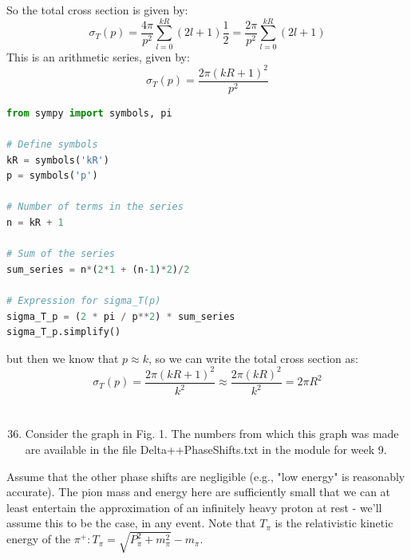 \documentclass[12pt]{article}
\begin{document}
So the total cross section is given by:
\begin{equation}
\sigma_T(p) = \frac{4 \pi}{p^2} \sum_{l=0}^{kR} (2 l+1) \frac{1}{2} = \frac{2 \pi}{p^2} \sum_{l=0}^{kR} (2 l+1)
\end{equation}
This is an arithmetic series, given by:
\begin{equation}
  \sigma_T(p) = \frac{2\pi (kR+1)^2}{p^2}
\end{equation}
\begin{lstlisting}[language=Python]
from sympy import symbols, pi

# Define symbols
kR = symbols('kR')
p = symbols('p')

# Number of terms in the series
n = kR + 1

# Sum of the series
sum_series = n*(2*1 + (n-1)*2)/2

# Expression for sigma_T(p)
sigma_T_p = (2 * pi / p**2) * sum_series
sigma_T_p.simplify()
\end{lstlisting}
but then we know that $p \approx k$, so we can write the total cross section as:
\begin{equation}
\sigma_T(p) = \frac{2\pi (kR+1)^2}{k^2} \approx \frac{2\pi (kR)^2}{k^2} = 2\pi R^2
\end{equation}
\section{}
\begin{enumerate}
  \setcounter{enumi}{35}
  \item Consider the graph in Fig. 1. The numbers from which this graph was made are available in the file Delta++PhaseShifts.txt in the module for week 9.
\end{enumerate}

Assume that the other phase shifts are negligible (e.g., "low energy" is reasonably accurate). The pion mass and energy here are sufficiently small that we can at least entertain the approximation of an infinitely heavy proton at rest - we'll assume this to be the case, in any event. Note that $T_{\pi}$ is the relativistic kinetic energy of the $\pi^{+}: T_{\pi}=\sqrt{P_{\pi}^{2}+m_{\pi}^{2}}-m_{\pi}$.
\end{document}
